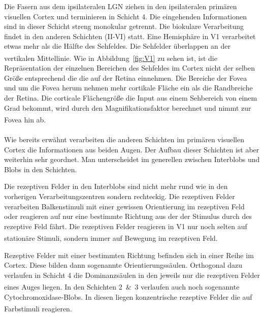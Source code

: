 \documentclass[12pt,a4paper,pdftex]{article}
\begin{document}
Die Fasern aus dem ipsilateralen LGN ziehen in den ipsilateralen primären visuellen Cortex und terminieren in Schicht 4. Die eingehenden Informationen sind in dieser Schicht streng monokular getrennt. Die biokulare Verarbeitung findet in den anderen Schichten (II-VI) statt. Eine Hemisphäre in V1 verarbeitet etwas mehr als die Hälfte des Sehfeldes. Die Sehfelder überlappen an der vertikalen Mittellinie. \textsuperscript{\cite[25]{kandel2013principles}} 
Wie in Abbildung~\ref{fig:V1} zu sehen ist, ist die Repräsentation der einzelnen Bereichen des Sehfeldes im Cortex nicht der selben Größe entsprechend die die auf der Retina einnehmen. Die Bereiche der Fovea und um die Fovea herum nehmen mehr cortikale Fläche ein als die Randbreiche der Retina. Die corticale Flächengröße die Input aus einem Sehbereich von einem Grad bekommt, wird durch den Magnifikationsfaktor berechnet und nimmt zur Fovea hin ab. \textsuperscript{\cite[25]{kandel2013principles}}
\\
\\
\noindent Wie bereits erwähnt verarbeiten die anderen Schichten im primären visuellen Cortex die Informationen aus beiden Augen. Der Aufbau dieser Schichten ist aber weiterhin sehr geordnet. Man unterscheidet im generellen zwischen Interblobs und Blobs in den Schichten.

Die rezeptiven Felder in den Interblobs sind nicht mehr rund wie in den vorherigen Verarbeitungszentren sondern rechteckig. Die rezeptiven Felder verarbeiten Balkenstimuli mit einer gewissen Orientierung im rezeptiven Feld oder reagieren auf nur eine bestimmte Richtung aus der der Stimulus durch des rezeptive Feld fährt. Die rezeptiven Felder reagieren in V1 nur noch selten auf stationäre Stimuli, sondern immer auf Bewegung im rezeptiven Feld. \textsuperscript{\cite[18]{smith2008biology}}

Rezeptive Felder mit einer bestimmten Richtung befinden sich in einer Reihe im Cortex. Diese bilden dann sogenannte Orientierungssäulen. Orthogonal dazu verlaufen in Schicht 4 die Dominanzsäulen in den jeweils nur die rezeptiven Felder eines Auges liegen. \textsuperscript{\cite[10]{neurowissenschaften_baer}} 
In den Schichten 2~\&~3 verlaufen auch noch sogenannte Cytochromoxidase-Blobs. In diesen liegen konzentrische rezeptive Felder die auf Farbstimuli reagieren. \textsuperscript{\cite[18]{smith2008biology}}
\end{document}

